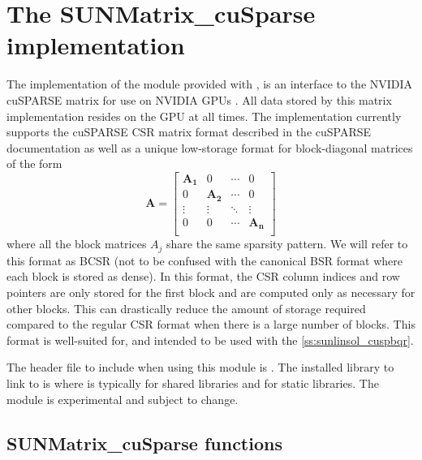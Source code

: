 \section{The SUNMatrix\_cuSparse implementation}\label{ss:sunmat_cusparse}

The  implementation of the  module provided with
{\sundials}, is an interface to the NVIDIA cuSPARSE matrix for use on NVIDIA GPUs
\cite{cuSPARSE}. All data stored by this matrix implementation resides on the
GPU at all times. The implementation currently supports the cuSPARSE CSR matrix
format described in the cuSPARSE documentation as well as a unique low-storage
format for block-diagonal matrices of the form
\begin{equation*}
  \mathbf{A} =
  \begin{bmatrix}
    \mathbf{A_1} & 0 & \cdots & 0\\
    0 & \mathbf{A_2} & \cdots & 0\\
    \vdots & \vdots & \ddots & \vdots\\
    0 & 0 & \cdots & \mathbf{A_n}\\
  \end{bmatrix}
\end{equation*}
where all the block matrices $A_j$ share the same sparsity pattern.
We will refer to this format as BCSR (not to be confused with the canonical BSR format where
each block is stored as dense). In this format, the CSR column indices and row pointers
are only stored for the first block and are computed only as necessary for other blocks.
This can drastically reduce the amount of storage required compared to the regular CSR
format when there is a large number of blocks. This format is well-suited for, and
intended to be used with the \ref{ss:sunlinsol_cuspbqr}.

\noindent The header file to include when using this module is
. The installed library to link to is
 where  is typically 
for shared libraries and  for static libraries.
\newline
\newline
{\warn}The  module is experimental and subject to change.

\subsection{SUNMatrix\_cuSparse functions}
\label{ss:sunmat_cusparse_functions}

